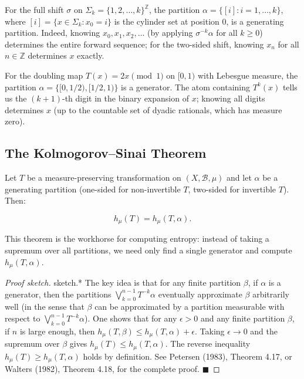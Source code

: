 \begin{example}
For the full shift $\sigma$ on $\Sigma_k = \{1, 2, \ldots, k\}^{\mathbb{Z}}$, the partition $\alpha = \{[i] : i = 1, \ldots, k\}$, where $[i] = \{x \in \Sigma_k : x_0 = i\}$ is the cylinder set at position $0$, is a generating partition. Indeed, knowing $x_0, x_1, x_2, \ldots$ (by applying $\sigma^{-k}\alpha$ for all $k \geq 0$) determines the entire forward sequence; for the two-sided shift, knowing $x_n$ for all $n \in \mathbb{Z}$ determines $x$ exactly.
\end{example}


\begin{example}
For the doubling map $T(x) = 2x \pmod{1}$ on $[0,1)$ with Lebesgue measure, the partition $\alpha = \{[0, 1/2), [1/2, 1)\}$ is a generator. The atom containing $T^k(x)$ tells us the $(k+1)$-th digit in the binary expansion of $x$; knowing all digits determines $x$ (up to the countable set of dyadic rationals, which has measure zero).
\end{example}


\subsection{The Kolmogorov–Sinai Theorem}\label{sec:11.5.2}

\begin{theorem}\label{thm:11.20}
Let $T$ be a measure-preserving transformation on $(X, \mathcal{B}, \mu)$ and let $\alpha$ be a generating partition (one-sided for non-invertible $T$, two-sided for invertible $T$). Then:

\[
h_\mu(T) = h_\mu(T, \alpha).
\]

This theorem is the workhorse for computing entropy: instead of taking a supremum over all partitions, we need only find a single generator and compute $h_\mu(T, \alpha)$.
\end{theorem}


\begin{proof}[Proof sketch]
sketch.* The key idea is that for any finite partition $\beta$, if $\alpha$ is a generator, then the partitions $\bigvee_{k=0}^{n-1} T^{-k}\alpha$ eventually approximate $\beta$ arbitrarily well (in the sense that $\beta$ can be approximated by a partition measurable with respect to $\bigvee_{k=0}^{n-1} T^{-k}\alpha$). One shows that for any $\epsilon > 0$ and any finite partition $\beta$, if $n$ is large enough, then $h_\mu(T, \beta) \leq h_\mu(T, \alpha) + \epsilon$. Taking $\epsilon \to 0$ and the supremum over $\beta$ gives $h_\mu(T) \leq h_\mu(T, \alpha)$. The reverse inequality $h_\mu(T) \geq h_\mu(T, \alpha)$ holds by definition. See Petersen (1983), Theorem 4.17, or Walters (1982), Theorem 4.18, for the complete proof. $\blacksquare$


\bigskip


\end{proof}

